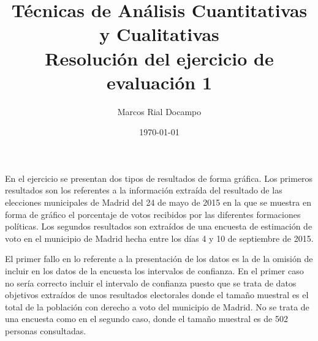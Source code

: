 \documentclass[11pt,a4paper]{article}
\author{Marcos Rial Docampo}
\title{Técnicas de Análisis Cuantitativas y Cualitativas\\Resolución del ejercicio de evaluación 1}
\date{\small{\today}}
\begin{document}
\pagestyle{empty}
\maketitle
\thispagestyle{empty}

En el ejercicio se presentan dos tipos de resultados de forma gráfica. Los primeros resultados son los referentes a la información extraída del resultado de las elecciones municipales de Madrid del 24 de mayo de 2015 en la que se muestra en forma de gráfico el porcentaje de votos recibidos por las diferentes formaciones políticas. Los segundos resultados son extraídos de una encuesta de estimación de voto en el municipio de Madrid hecha entre los días 4 y 10 de septiembre de 2015.

El primer fallo en lo referente a la presentación de los datos es la de la omisión de incluir en los datos de la encuesta los intervalos de confianza. En el primer caso no sería correcto incluir el intervalo de confianza puesto que se trata de datos objetivos extraídos de unos resultados electorales donde el tamaño muestral es el total de la población con derecho a voto del municipio de Madrid. No se trata de una encuesta como en el segundo caso, donde el tamaño muestral es de 502 personas consultadas.
\end{document}
